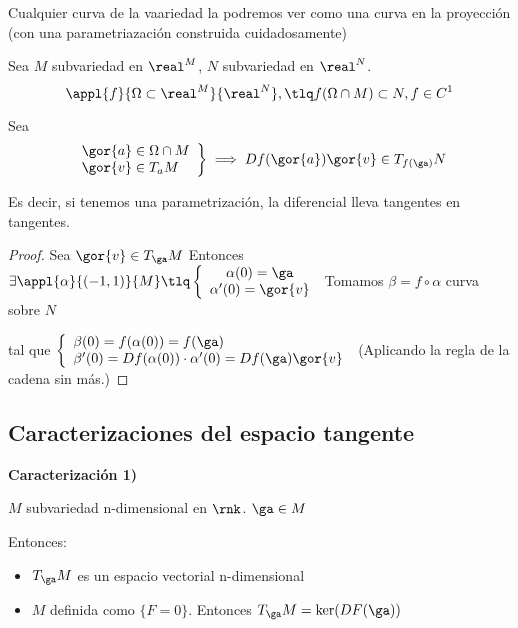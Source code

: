 \obs Cualquier curva de la vaariedad la podremos ver como una curva en la proyección (con una parametriazación construida cuidadosamente)

\begin{theorem}
Sea $M$ subvariedad en $\real^M$, $N$ subvariedad en $\real^N$.
\[\appl{f}{\Omega\subset\real^M}{\real^N}, \tlq f(\Omega\cap M) \subset N, f\in C^1\]

Sea \[\left.\begin{array}{lc}
\gor{a} \in \Omega\cap M \\ 
\gor{v} \in T_aM
\end{array}\right\} 
\implies Df(\gor{a})\gor{v} \in T_{f(\ga)}N\]
\end{theorem}

Es decir, si tenemos una parametrización, la diferencial lleva tangentes en tangentes.

\begin{proof}
Sea $\gor{v} \in T_{\ga} M$
Entonces $\exists \appl{\alpha}{(-1,1)}{M} \tlq \left\{\begin{array}{c}
\alpha(0) = \ga\\
\alpha'(0) = \gor{v}
\end{array}\right.$
Tomamos $\beta = f \circ \alpha$ curva sobre $N$ 

tal que $\left\{\begin{array}{lc} \beta(0) = f(\alpha(0)) = f(\ga)\\ 
\beta'(0) = Df(\alpha(0))\cdot \alpha'(0) = Df(\ga)\gor{v}\end{array}\right.$ (Aplicando la regla de la cadena sin más.)
\end{proof}


\subsection{Caracterizaciones del espacio tangente}
\textbf{Caracterización 1)}
\begin{theorem}

$M$ subvariedad n-dimensional en $\rnk$. $\ga \in M$

Entonces:

\begin{itemize}
\item $T_{\ga}M$ es un espacio vectorial n-dimensional
\item $M$ definida como $\{F = 0\}$. Entonces $T_{\ga} M = \ker(DF(\ga))$
\end{itemize}
\end{theorem}

